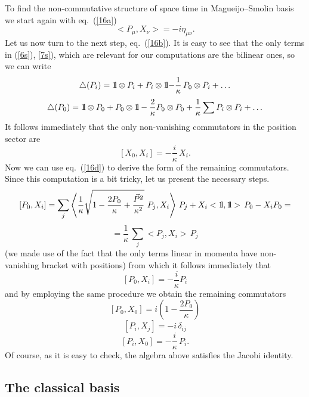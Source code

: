 \documentclass[a4paper,a4paper]{article}
\def\bbbone{{\mathchoice {\rm 1\mskip-4mu l} {\rm 1\mskip-4mu l}
{\rm 1\mskip-4.5mu l} {\rm 1\mskip-5mu l}}}
\begin{document}
To find the non-commutative structure of space time in Magueijo--Smolin basis we start again with eq.~(\ref{16a})
$$
 <P_\mu, X_\nu> =  -i \eta_{\mu\nu}.
$$
Let us now turn to the next step, eq.~(\ref{16b}). It is easy to
see that the only terms in (\ref{6s}), \ref{7s}),  which are
relevant for our computations are the bilinear ones, so we can
write
$$
  \triangle(P_{i})=\bbbone \otimes P_{i} + P_{i} \otimes \bbbone {-\frac{1}{\kappa}}\, P_{0} \otimes P_{i} + \ldots
$$
$$
  \triangle(P_{0})= \bbbone \otimes P_{0} + P_{0} \otimes \bbbone -
  \frac{2}{\kappa}P_{0} \otimes P_{0} +  \frac{1}{\kappa}\sum P_{i}\otimes P_{i}+ \ldots
$$
It follows immediately that the only non-vanishing commutators in the position sector are
\begin{equation}\label{18}
  [X_0, X_i] = -\frac{i}\kappa\, X_i.
\end{equation}
Now we can use eq.~(\ref{16d}) to derive the form of the remaining
commutators. Since this computation is a bit tricky, let us
present the necessary steps.
$$
[P_0, X_i] = \sum_j \left<\frac{1}{\kappa} \sqrt{1 -
\frac{2P_{0}}{\kappa} +
   \frac{\vec{P}^{2}}{\kappa^{2}}} \,\,  P_{j}, X_i\right>\, P_j   +
X_i <\bbbone, \bbbone>\, P_0 - X_i P_0 =
$$
$$
=\frac{1}{\kappa}\,\sum_j <P_{j}, X_i>\, P_j
$$
(we made use of the fact that the only terms linear in momenta
have non-vanishing bracket with positions) from which it follows
immediately that
\begin{equation}\label{19b}
 [P_0, X_i] =  -\frac{i}\kappa P_i
\end{equation}
and by employing the same procedure we obtain the remaining
commutators
\begin{equation}\label{19a}
 [P_0, X_0] = i\left(1 - \frac{2P_0}\kappa \right)
\end{equation}
\begin{equation}\label{19c}
  [P_i, X_j] = -i \, \delta_{ij}
\end{equation}
\begin{equation}\label{19d}
 [P_i, X_0] = -\frac{i}\kappa\, P_i.
\end{equation}
Of course, as it is easy to check, the algebra above satisfies the
Jacobi identity.


\subsection{The classical basis}
\end{document}
